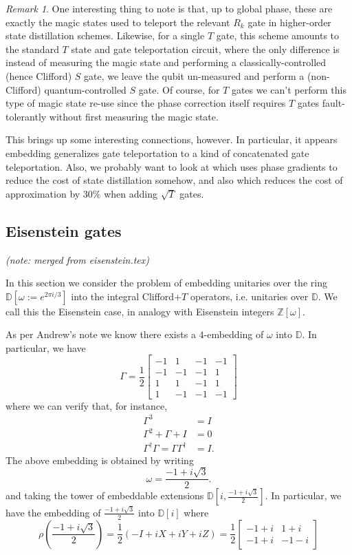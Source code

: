 \documentclass{article}
\theoremstyle{definition}
\theoremstyle{theorem}
\theoremstyle{remark}
\newtheorem{remark}{Remark}
\begin{document}
\begin{remark}
One interesting thing to note is that, up to global phase, these are exactly the magic states used to teleport the relevant $R_k$ gate in higher-order state distillation schemes. Likewise, for a single $T$ gate, this scheme amounts to the standard $T$ state and gate teleportation circuit, where the only difference is instead of measuring the magic state and performing a classically-controlled (hence Clifford) $S$ gate, we leave the qubit un-measured and perform a (non-Clifford) quantum-controlled $S$ gate. Of course, for $T$ gates we can't perform this type of magic state re-use since the phase correction itself requires $T$ gates fault-tolerantly without first measuring the magic state.

This brings up some interesting connections, however. In particular, it appears embedding generalizes gate teleportation to a kind of concatenated gate teleportation. Also, we probably want to look at \cite{phasegradientdistill} which uses phase gradients to reduce the cost of state distillation somehow, and also \cite{hierarchysynth} which reduces the cost of approximation by $30\%$ when adding $\sqrt{T}$ gates.
\end{remark}

\subsection{Eisenstein gates}

\emph{(note: merged from eisenstein.tex)}

In this section we consider the problem of embedding unitaries over the ring $\mathbb{D}[\omega := e^{2\pi i/3}]$ into the integral Clifford+$T$ operators, i.e. unitaries over $\mathbb{D}$. We call this the Eisenstein case, in analogy with Eisenstein integers $\mathbb{Z}[\omega]$.

As per Andrew's note we know there exists a $4$-embedding of $\omega$ into $\mathbb{D}$. In particular, we have
\[
	\Gamma = \frac{1}{2}
	\begin{bmatrix} 
		-1 & 1 & -1 & -1 \\
		-1 & -1 & -1 & 1 \\
		1 & 1 & -1 & 1 \\
		1 & -1 & -1 & -1
	\end{bmatrix}
\]
where we can verify that, for instance,
\begin{align*}
	\Gamma^3 &= I \\
	\Gamma^2 + \Gamma + I &= 0 \\
	\Gamma^\dagger \Gamma = \Gamma\Gamma^\dagger &= I.
\end{align*}
The above embedding is obtained by writing
\[
	\omega = \frac{-1 + i\sqrt{3}}{2}.
\]
and taking the tower of embeddable extensions $\mathbb{D}[i, \frac{-1 + i\sqrt{3}}{2}]$. In particular, we have the embedding of $\frac{-1 + i\sqrt{3}}{2}$ into $\mathbb{D}[i]$ where
\[
	\rho\left(\frac{-1 + i\sqrt{3}}{2}\right) 
	= \frac{1}{2}\left(-I + iX + iY + iZ\right) 
	= \frac{1}{2}\begin{bmatrix}  -1 + i & 1 + i \\ -1 + i & -1 -i \end{bmatrix}
\]
\end{document}
